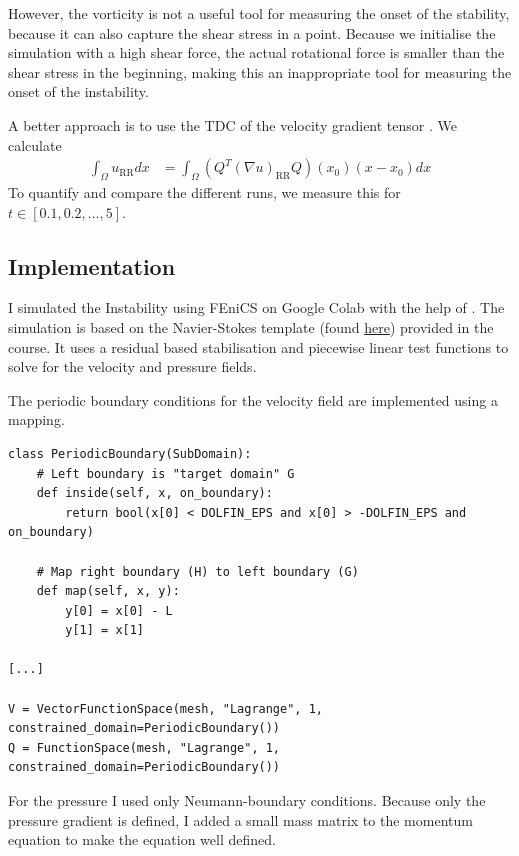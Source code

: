\documentclass[a4paper,12pt]{article}
\begin{document}
However, the vorticity is not a useful tool for measuring the onset of the stability, because it can also capture the shear stress in a point.
Because we initialise the simulation with a high shear force, the actual rotational force is smaller than the shear stress in the beginning, making this an inappropriate tool for measuring the onset of the instability.

A better approach is to use the \ac{TDC} of the velocity gradient tensor \cite{Hoffman2021a, Keylock2018}.
We calculate
\begin{align}
  \label{eq:tripledec}
  \int_{\Omega} u_{\textrm{RR}} dx &= \int_{\Omega} (Q^{T} (\nabla u)_{\textrm{RR}} Q) (x_0)(x - x_0) dx
\end{align}
To quantify and compare the different runs, we measure this for $t \in [0.1, 0.2, ..., 5]$.

\subsection{Implementation}
I simulated the Instability using FEniCS \cite{Alnaes2015} on Google Colab \cite{Colab2025} with the help of \cite{FEMColab2021}.
The simulation is based on the Navier-Stokes template (found \href{https://github.com/johanhoffman/DD2365_VT25/blob/main/template-report-Navier-Stokes.ipynb}{here}) provided in the course.
It uses a residual based stabilisation and piecewise linear test functions to solve for the velocity and pressure fields.

The periodic boundary conditions for the velocity field are implemented using a mapping.
\begin{lstlisting}
class PeriodicBoundary(SubDomain):
    # Left boundary is "target domain" G
    def inside(self, x, on_boundary):
        return bool(x[0] < DOLFIN_EPS and x[0] > -DOLFIN_EPS and on_boundary)

    # Map right boundary (H) to left boundary (G)
    def map(self, x, y):
        y[0] = x[0] - L
        y[1] = x[1]

[...]

V = VectorFunctionSpace(mesh, "Lagrange", 1, constrained_domain=PeriodicBoundary())
Q = FunctionSpace(mesh, "Lagrange", 1, constrained_domain=PeriodicBoundary())
\end{lstlisting}
For the pressure I used only Neumann-boundary conditions.
Because only the pressure gradient is defined, I added a small mass matrix to the momentum equation to make the equation well defined.
\end{document}
